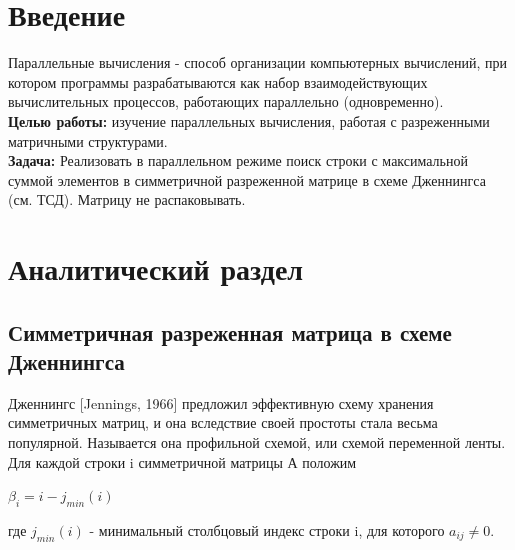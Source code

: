 \chapter*{Введение}


Параллельные вычисления - способ организации компьютерных вычислений,
при котором программы разрабатываются как набор взаимодействующих вычислительных процессов, работающих параллельно (одновременно).
\\


\textbf{Целью работы:} изучение параллельных вычисления,
работая с разреженными матричными структурами.
\\

\textbf{Задача:}
Реализовать в параллельном режиме поиск строки с максимальной суммой элементов в симметричной разреженной матрице в схеме Дженнингса (см. ТСД). Матрицу не распаковывать.



\chapter{Аналитический раздел}
\label{cha:analysis}



\section{Симметричная разреженная матрица в схеме Дженнингса}

Дженнингс [Jennings, 1966] предложил эффективную схему хранения
симметричных матриц, и она вследствие своей простоты стала
весьма популярной. Называется она профильной схемой, или
схемой переменной ленты.
Для каждой строки i симметричной матрицы А положим

$\beta_i = i - j_{min}(i)$

где $j_{min}(i)$ - минимальный столбцовый индекс строки i,
для которого $a_{ij} \ne 0$.


